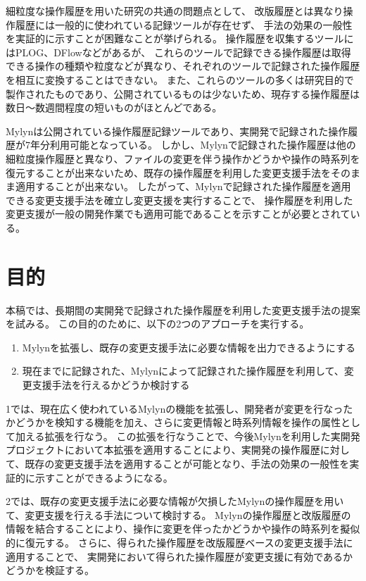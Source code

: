 \documentclass[a4paper]{jsbook}
\begin{document}
細粒度な操作履歴を用いた研究の共通の問題点として、
改版履歴とは異なり操作履歴には一般的に使われている記録ツールが存在せず、
手法の効果の一般性を実証的に示すことが困難なことが挙げられる。
操作履歴を収集するツールにはPLOG\cite{plog}、{\sc DFlow}\cite{minelli:2014}などがあるが、
これらのツールで記録できる操作履歴は取得できる操作の種類や粒度などが異なり、それぞれのツールで記録された操作履歴を相互に変換することはできない。
また、これらのツールの多くは研究目的で製作されたものであり、公開されているものは少ないため、現存する操作履歴は数日〜数週間程度の短いものがほとんどである。

Mylyn\cite{Kersten:2005}は公開されている操作履歴記録ツールであり、実開発で記録された操作履歴が7年分利用可能となっている。
しかし、Mylynで記録された操作履歴は他の細粒度操作履歴と異なり、ファイルの変更を伴う操作かどうかや操作の時系列を復元することが出来ないため、既存の操作履歴を利用した変更支援手法をそのまま適用することが出来ない。
したがって、Mylynで記録された操作履歴を適用できる変更支援手法を確立し変更支援を実行することで、
操作履歴を利用した変更支援が一般の開発作業でも適用可能であることを示すことが必要とされている。
\section{目的}
本稿では、長期間の実開発で記録された操作履歴を利用した変更支援手法の提案を試みる。
この目的のために、以下の2つのアプローチを実行する。
\begin{enumerate}
  \item Mylynを拡張し、既存の変更支援手法に必要な情報を出力できるようにする
  \item 現在までに記録された、Mylynによって記録された操作履歴を利用して、変更支援手法を行えるかどうか検討する
\end{enumerate}
1では、現在広く使われているMylynの機能を拡張し、開発者が変更を行なったかどうかを検知する機能を加え、さらに変更情報と時系列情報を操作の属性として加える拡張を行なう。
この拡張を行なうことで、今後Mylynを利用した実開発プロジェクトにおいて本拡張を適用することにより、実開発の操作履歴に対して、既存の変更支援手法を適用することが可能となり、手法の効果の一般性を実証的に示すことができるようになる。

2では、既存の変更支援手法に必要な情報が欠損したMylynの操作履歴を用いて、変更支援を行える手法について検討する。
Mylynの操作履歴と改版履歴の情報を結合することにより、操作に変更を伴ったかどうかや操作の時系列を擬似的に復元する。
さらに、得られた操作履歴を改版履歴ベースの変更支援手法に適用することで、
実開発において得られた操作履歴が変更支援に有効であるかどうかを検証する。
\end{document}
